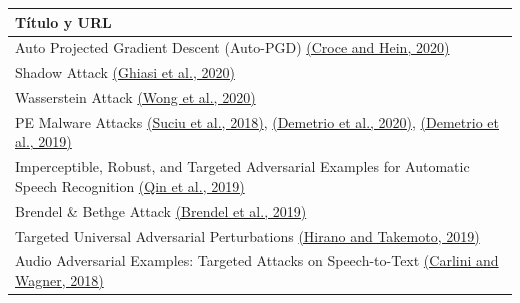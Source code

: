\begin{table}[H]
    \centering
    \footnotesize
    \begin{tabularx}{\linewidth}{|X|}\hline
        \textbf{Título y URL}                                                                                                                                                                                                \\ \hline
        Auto Projected Gradient Descent (Auto-PGD) \href{https://arxiv.org/abs/2003.01690}{(Croce and Hein, 2020)}                                                                                                           \\ \hline
        Shadow Attack \href{https://arxiv.org/abs/2003.08937}{(Ghiasi et al., 2020)}                                                                                                                                         \\ \hline
        Wasserstein Attack \href{https://arxiv.org/abs/1902.07906}{(Wong et al., 2020)}                                                                                                                                      \\ \hline
        PE Malware Attacks \href{https://arxiv.org/abs/1810.08280}{(Suciu et al., 2018)}, \href{https://arxiv.org/abs/2008.07125}{(Demetrio et al., 2020)}, \href{https://arxiv.org/abs/1901.03583}{(Demetrio et al., 2019)} \\ \hline
        Imperceptible, Robust, and Targeted Adversarial Examples for Automatic Speech Recognition \href{https://arxiv.org/abs/1903.10346}{(Qin et al., 2019)}                                                                \\ \hline
        Brendel \& Bethge Attack \href{https://arxiv.org/abs/1907.01003}{(Brendel et al., 2019)}                                                                                                                             \\ \hline
        Targeted Universal Adversarial Perturbations \href{https://arxiv.org/abs/1911.06502}{(Hirano and Takemoto, 2019)}                                                                                                    \\ \hline
        Audio Adversarial Examples: Targeted Attacks on Speech-to-Text \href{https://arxiv.org/abs/1801.01944}{(Carlini and Wagner, 2018)}                                                                                   \\ \hline

\end{tabularx}
\end{table}
